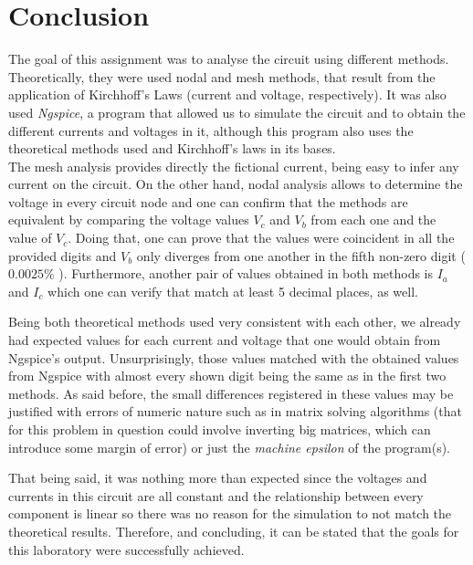 \section{Conclusion}
The goal of this assignment was to analyse the circuit using different methods. Theoretically, they were used nodal and mesh methods, that result from the application of Kirchhoff's Laws (current and voltage, respectively). It was also used \textit{Ngspice}, a program that allowed us to simulate the circuit and to obtain the different currents and voltages in it, although this program also uses the theoretical methods used and Kirchhoff's laws in its bases. \\

The mesh analysis provides directly the fictional current, being easy to infer any current on the circuit. On the other hand, nodal analysis allows to determine the voltage in every circuit node and one can confirm that the methods are equivalent by comparing the voltage values $V_c$ and $V_b$ from each one and the value of $V_c$. Doing that, one can prove that the values were coincident in all the provided digits and $V_b$ only diverges from one another in the fifth non-zero digit ( $0.0025\%$ ). Furthermore, another pair of values obtained in both methods is $I_a$ and $I_c$ which one can verify that match at least 5 decimal places, as well.

Being both theoretical methods used very consistent with each other, we already had expected values for each current and voltage that one would obtain from Ngspice's output. Unsurprisingly, those values matched with the obtained values from Ngspice with almost every shown digit being the same as in the first two methods. As said before, the small differences registered in these values may be justified with errors of numeric nature such as in matrix solving algorithms (that for this problem in question could involve inverting big matrices, which can introduce some margin of error) or just the \textit{machine epsilon} of the program(s).

That being said, it was nothing more than expected since the voltages and  currents in this circuit are all constant and the relationship between every component is linear so there was no reason for the simulation to not match the theoretical results. Therefore, and concluding, it can be stated that the goals for this laboratory were successfully achieved.